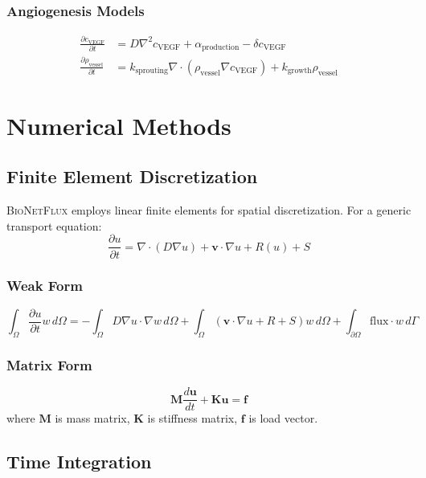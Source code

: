 \documentclass[11pt,a4paper]{article}
\newcommand{\bionetflux}{\textsc{BioNetFlux}}
\begin{document}
\subsubsection{Angiogenesis Models}
\begin{align}
\frac{\partial c_{\text{VEGF}}}{\partial t} &= D\nabla^2 c_{\text{VEGF}} + \alpha_{\text{production}} - \delta c_{\text{VEGF}}\\
\frac{\partial \rho_{\text{vessel}}}{\partial t} &= k_{\text{sprouting}} \nabla \cdot (\rho_{\text{vessel}} \nabla c_{\text{VEGF}}) + k_{\text{growth}} \rho_{\text{vessel}}
\end{align}

\section{Numerical Methods}

\subsection{Finite Element Discretization}

\bionetflux{} employs linear finite elements for spatial discretization. For a generic transport equation:
\begin{equation}
\frac{\partial u}{\partial t} = \nabla \cdot (D\nabla u) + \bm{v} \cdot \nabla u + R(u) + S
\end{equation}

\subsubsection{Weak Form}
\begin{equation}
\int_\Omega \frac{\partial u}{\partial t} w \, d\Omega = -\int_\Omega D\nabla u \cdot \nabla w \, d\Omega + \int_\Omega (\bm{v} \cdot \nabla u + R + S) w \, d\Omega + \int_{\partial\Omega} \text{flux} \cdot w \, d\Gamma
\end{equation}

\subsubsection{Matrix Form}
\begin{equation}
\bm{M} \frac{d\bm{u}}{dt} + \bm{K} \bm{u} = \bm{f}
\end{equation}
where $\bm{M}$ is mass matrix, $\bm{K}$ is stiffness matrix, $\bm{f}$ is load vector.

\subsection{Time Integration}
\end{document}
